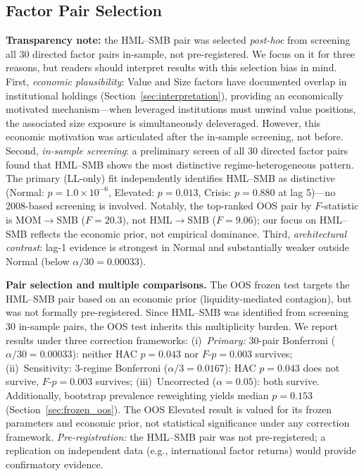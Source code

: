 \documentclass[sigconf,anonymous]{acmart}
\begin{document}
\subsection{Factor Pair Selection}
\label{sec:pairselection}

\textbf{Transparency note:} the HML--SMB pair was selected \emph{post-hoc}
from screening all 30 directed factor pairs in-sample, not pre-registered.
We focus on it for three reasons, but readers should interpret results
with this selection bias in mind.
First, \emph{economic plausibility}: Value and Size factors have documented overlap
in institutional holdings (Section~\ref{sec:interpretation}), providing an
economically motivated mechanism---when leveraged institutions must unwind value
positions, the associated size exposure is simultaneously deleveraged.
However, this economic motivation was articulated after the in-sample screening,
not before.
Second, \emph{in-sample screening}: a preliminary screen of all 30 directed
factor pairs found that HML--SMB shows the most distinctive regime-heterogeneous
pattern. The primary (LL-only) fit independently identifies HML--SMB as
distinctive (Normal: $p = 1.0 \times 10^{-6}$, Elevated: $p = 0.013$,
Crisis: $p = 0.880$ at lag 5)---no 2008-based screening is involved.
Notably, the top-ranked OOS pair by $F$-statistic is MOM$\to$SMB
($F = 20.3$), not HML$\to$SMB ($F = 9.06$); our focus on HML--SMB
reflects the economic prior, not empirical dominance.
Third, \emph{architectural contrast}: lag-1 evidence is strongest in Normal and
substantially weaker outside Normal (below $\alpha/30 = 0.00033$).

\textbf{Pair selection and multiple comparisons.} The OOS frozen test targets
the HML--SMB pair based on an economic prior (liquidity-mediated contagion),
but was not formally pre-registered. Since HML--SMB was identified from screening
30 in-sample pairs, the OOS test inherits this multiplicity burden.
We report results under three correction frameworks:
(i)~\emph{Primary:} 30-pair Bonferroni ($\alpha/30 = 0.00033$): neither HAC $p = 0.043$
nor $F$-$p = 0.003$ survives;
(ii)~Sensitivity: 3-regime Bonferroni ($\alpha/3 = 0.0167$): HAC $p = 0.043$
does not survive, $F$-$p = 0.003$ survives;
(iii)~Uncorrected ($\alpha = 0.05$): both survive.
Additionally, bootstrap prevalence reweighting
yields median $p = 0.153$ (Section~\ref{sec:frozen_oos}).
The OOS Elevated result is valued for its frozen parameters and
economic prior, not statistical significance under any correction framework.
\emph{Pre-registration:} the HML--SMB pair was not pre-registered;
a replication on independent data (e.g., international factor
returns) would provide confirmatory evidence.
\end{document}
